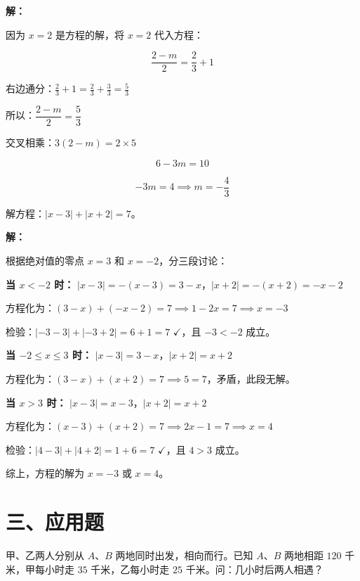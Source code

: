 \documentclass[12pt, a4paper]{ctexart}
\begin{document}
\textbf{解：}

因为 $x=2$ 是方程的解，将 $x=2$ 代入方程：

$$\frac{2-m}{2}=\frac{2}{3}+1$$

右边通分：$\frac{2}{3}+1=\frac{2}{3}+\frac{3}{3}=\frac{5}{3}$

所以：$\dfrac{2-m}{2}=\dfrac{5}{3}$

交叉相乘：$3(2-m)=2\times 5$

$$6-3m=10$$

$$-3m=4 \implies m=-\frac{4}{3}$$

\vspace{6pt}

\begin{examplebox}
解方程：$|x-3|+|x+2|=7$。
\end{examplebox}

\textbf{解：}

根据绝对值的零点 $x=3$ 和 $x=-2$，分三段讨论：

\textbf{当 $x<-2$ 时：}
$|x-3|=-(x-3)=3-x$，$|x+2|=-(x+2)=-x-2$

方程化为：$(3-x)+(-x-2)=7 \implies 1-2x=7 \implies x=-3$

检验：$|-3-3|+|-3+2|=6+1=7$ $\checkmark$，且 $-3<-2$ 成立。

\textbf{当 $-2\leqslant x\leqslant 3$ 时：}
$|x-3|=3-x$，$|x+2|=x+2$

方程化为：$(3-x)+(x+2)=7 \implies 5=7$，矛盾，此段无解。

\textbf{当 $x>3$ 时：}
$|x-3|=x-3$，$|x+2|=x+2$

方程化为：$(x-3)+(x+2)=7 \implies 2x-1=7 \implies x=4$

检验：$|4-3|+|4+2|=1+6=7$ $\checkmark$，且 $4>3$ 成立。

综上，方程的解为 $x=-3$ 或 $x=4$。

\section*{\textcolor{apppurple}{三、应用题}}

\begin{appbox}[【应用1】行程问题——相遇]
甲、乙两人分别从 $A$、$B$ 两地同时出发，相向而行。已知 $A$、$B$ 两地相距 $120$ 千米，甲每小时走 $35$ 千米，乙每小时走 $25$ 千米。问：几小时后两人相遇？
\end{appbox}
\end{document}
